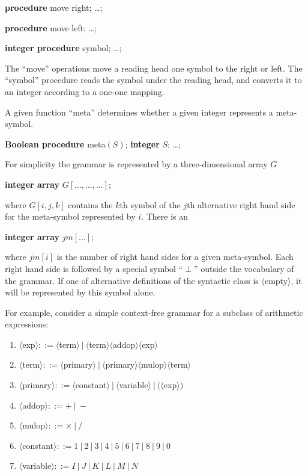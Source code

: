 \quad \textbf{procedure} move right; \dots;

\quad \textbf{procedure} move left; \dots;

\quad \textbf{integer procedure} symbol; \dots;

\noindent
The ``move'' operations move a reading head one symbol to the right or left. The ``symbol'' procedure reads the symbol under the reading head, and converts it to an integer according to a one-one mapping.

A given function ``meta'' determines whether a given integer represents a meta-symbol.

\quad \textbf{Boolean procedure} meta$(S)$; \textbf{integer} $S$; \dots;

\noindent
For simplicity the grammar is represented by a three-dimensional array $G$

\quad \textbf{integer array} $G[\dots, \dots, \dots]$;

\noindent
where $G[i, j, k]$ contains the $k$th symbol of the $j$th alternative right hand side for the meta-symbol represented by $i$. There is an

\quad \textbf{integer array} $jm[\dots]$;

\noindent
where $jm[i]$ is the number of right hand sides for a given meta-symbol. Each right hand side is followed by a special symbol ``$\perp$'' outside the vocabulary of the grammar. If one of alternative definitions of the syntactic class is $\langle$empty$\rangle$, it will be represented by this symbol alone.

For example, consider a simple context-free grammar for a subclass of arithmetic expressions:

\begin{enumerate}[wide, nosep, label=(\arabic*)]
	\item $\langle$exp$\rangle ::= \langle$term$\rangle\ |\ \langle$term$\rangle\langle$addop$\rangle\langle$exp$\rangle$
	\item $\langle$term$\rangle ::= \langle$primary$\rangle\ |\ \langle$primary$\rangle\langle$mulop$\rangle\langle$term$\rangle$
	\item $\langle$primary$\rangle ::= \langle$constant$\rangle\ |\ \langle$variable$\rangle\ |\ (\langle$exp$\rangle)$
	\item $\langle$addop$\rangle ::= +\ |\ -$
	\item $\langle$mulop$\rangle ::= \times\ |\ /$
	\item $\langle$constant$\rangle ::= 1\ |\ 2\ |\ 3\ |\ 4\ |\ 5\ |\ 6\ |\ 7\ |\ 8\ |\ 9\ |\ 0$
	\item $\langle$variable$\rangle ::= I\ |\ J\ |\ K\ |\ L\ |\ M\ |\ N$
\end{enumerate}

